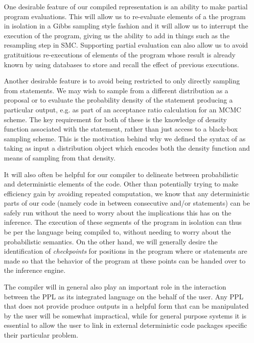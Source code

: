 One desirable feature of our compiled representation is an ability to make partial
program evaluations.  This will allow us to re-evaluate elements of a the program in
isolation in a Gibbs sampling style fashion and it will allow us to interrupt the execution
of the program, giving us the ability to add in things such as the resampling step in SMC.
Supporting partial evaluation can also allow us to avoid gratituitious re-executions of
elements of the program whose result is already known by using databases to store and
recall the effect of previous executions.

Another desirable feature is to avoid being restricted to only directly sampling from \sample
statements.  We may wish to sample from a different distribution as a proposal or to evaluate
the probability density of the \sample statement producing a particular output, e.g. as part
of an acceptance ratio calculation for an MCMC scheme.  The key requirement for both of these
is the knowledge of density function associated with the \sample statement, rather than
just access to a black-box sampling scheme.  This is the motivation behind why we defined
the syntax of \sample as taking as input a distribution object which encodes both the density
function and means of sampling from that density.

It will also often be helpful for our compiler to delineate between probabilistic and deterministic
elements of the code.  Other than potentially trying to make efficiency gain by avoiding
repeated computation, we know that any deterministic parts of our code (namely code in between
consecutive \sample and/or \observe statements) can be safely run without the need
to worry about the implications this has on the inference.  The execution of these segments of
the program in isolation can thus be per the language being compiled to, without needing to
worry about the probabilistic semantics.  On the other hand, we will generally desire the identification
of \emph{checkpoints} for positions in the program where \sample or \observe statements are
made so that the behavior of the program at these points can be handed over to the inference
engine.

The compiler will in general also play an important role in the interaction between the PPL
as its integrated language on the behalf of the user.  Any PPL that does not provide produce
outputs in a helpful form that can be manipulated by the user will be somewhat impractical,
while for general purpose systems it is essential to allow the user to link in external 
deterministic code packages specific their particular problem.

